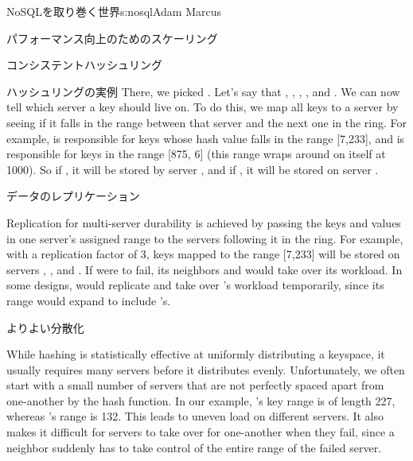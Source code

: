 \begin{aosachapter}{NoSQLを取り巻く世界}{s:nosql}{Adam Marcus}
\begin{aosasect1}{パフォーマンス向上のためのスケーリング}
\begin{aosasect2}{コンシステントハッシュリング}
\begin{aosasect3}{ハッシュリングの実例}
There, we picked .  Let's say that , , , , and .  We can now tell which
server a key should live on.  To do this, we map all keys to a server
by seeing if it falls in the range between that server and the next
one in the ring.  For example,  is responsible for keys whose
hash value falls in the range [7,233], and  is responsible for
keys in the range [875, 6] (this range wraps around on itself at
1000).  So if , it will be stored by
server , and if , it will be
stored on server .

\end{aosasect3}

\begin{aosasect3}{データのレプリケーション}

Replication for multi-server durability is achieved by passing the
keys and values in one server's assigned range to the servers
following it in the ring.  For example, with a replication factor of
3, keys mapped to the range [7,233] will be stored on servers
, , and .  If  were to fail, its
neighbors  and  would take over its workload.  In some designs,
 would replicate and take over 's workload temporarily, 
since its range would expand to include 's.

\end{aosasect3}

\begin{aosasect3}{よりよい分散化}

While hashing is statistically effective at uniformly distributing a
keyspace, it usually requires many servers before it distributes
evenly.  Unfortunately, we often start with a small number of servers
that are not perfectly spaced apart from one-another by the hash
function.  In our example, 's key range is of length 227,
whereas 's range is 132.  This leads to uneven load on
different servers.  It also makes it difficult for servers to take
over for one-another when they fail, since a neighbor suddenly has to
take control of the entire range of the failed server.


\end{aosasect3}
\end{aosasect2}
\end{aosasect1}
\end{aosachapter}
